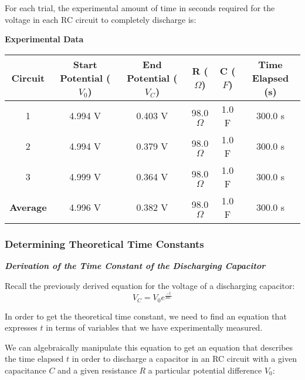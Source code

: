 \documentclass[12pt]{article}
\begin{document}
For each trial, the experimental amount of time in seconds required for the voltage in each RC circuit to completely discharge is:
\begin{center}
\textbf{Experimental Data}
\end{center}
\begin{table}[h!]
\centering
\begin{tabular}{||c c c c c c||} 
 \hline
\footnotesize Circuit & Start Potential ($V_0$) & End Potential ($V_C$) & R ($\Omega$) & C ($F$) & Time Elapsed (s) \\ [0.5ex] 
 \hline
 1 & 4.994 V & 0.403 V & 98.0$\Omega$ & 1.0 F & 300.0 s \\ 
 2 & 4.994 V & 0.379 V & 98.0$\Omega$ & 1.0 F & 300.0 s  \\
 3 & 4.999 V & 0.364 V & 98.0$\Omega$ & 1.0 F & 300.0 s \\ 
 \hline
 \textbf{Average} & 4.996 V & 0.382 V & 98.0$\Omega$ & 1.0 F & 300.0 s \\
 \hline
\end{tabular}
\end{table}

\pagebreak
\subsubsection*{Determining Theoretical Time Constants} 

\textbf{\emph{Derivation of the Time Constant of the Discharging Capacitor}}

Recall the previously derived equation for the voltage of a discharging capacitor:
$$V_C = V_0 e^{\frac{-t}{RC}}$$ 

In order to get the theoretical time constant, we need to find an equation that expresses $t$ in terms of variables that we have experimentally measured.

We can algebraically manipulate this equation to get an equation that describes the time elapsed $t$ in order to discharge a capacitor in an RC circuit with a given capacitance $C$ and a given resistance $R$ a particular potential difference $V_0$:
\end{document}
